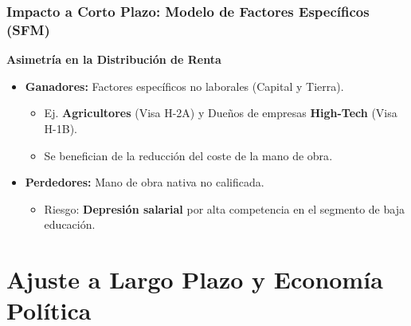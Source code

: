 \documentclass{beamer}
\begin{document}
\begin{frame}
\frametitle{Impacto a Corto Plazo: Modelo de Factores Específicos (SFM)}
\begin{block}{\textbf{Asimetría en la Distribución de Renta}}
\begin{itemize}
\item \textbf{Ganadores:} Factores específicos no laborales (Capital y Tierra).
\begin{itemize}
\item Ej. \textbf{Agricultores} (Visa H-2A) y Dueños de empresas \textbf{High-Tech} (Visa H-1B).
\item Se benefician de la \alert{reducción del coste de la mano de obra}.
\end{itemize}
\item \textbf{Perdedores:} Mano de obra nativa no calificada.
\begin{itemize}
\item Riesgo: \textbf{Depresión salarial} por alta competencia en el segmento de baja educación.
\end{itemize}
\end{itemize}
\end{block}
\end{frame}

\section{Ajuste a Largo Plazo y Economía Política}
\end{document}
